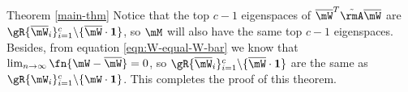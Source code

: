 \begin{proofof}{Theorem \cref{main-thm}}
Notice that the top $c-1$ eigenspaces of $\overline{\mW}^T\tilde{\rmA}\overline{\mW}$ are $\gR\{\overline{\mW}_i\}_{i=1}^c\backslash\{\overline{\mW}\cdot\textbf{1}\}$, so $\mM$ will also have the same top $c-1$ eigenspaces. Besides, from equation \cref{eqn:W-equal-W-bar} we know that $\lim_{n\to\infty}\fn{\mW-\overline{\mW}}=0$, so $\gR\{\overline{\mW}_i\}_{i=1}^c\backslash\{\overline{\mW}\cdot\textbf{1}\}$ are the same as $\gR\{\mW_i\}_{i=1}^c\backslash\{\mW\cdot\textbf{1}\}$. This completes the proof of this theorem.


%


\end{proofof}
